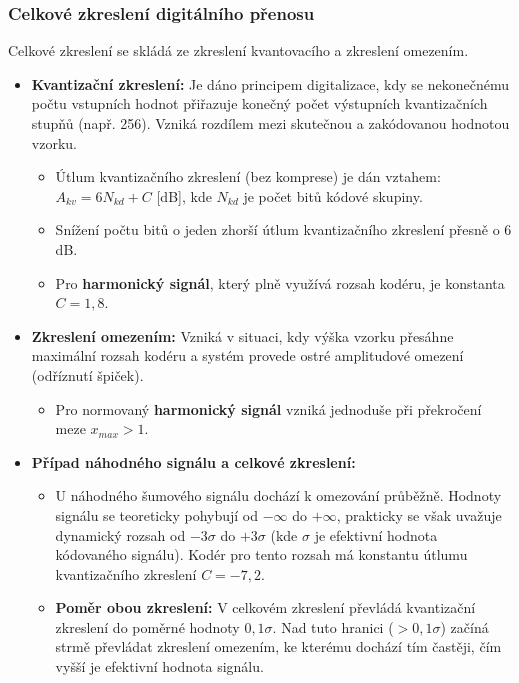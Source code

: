     \subsubsection{Celkové zkreslení digitálního přenosu}
        Celkové zkreslení se skládá ze zkreslení kvantovacího a zkreslení omezením.
        \begin{itemize}
            \item \textbf{Kvantizační zkreslení:} Je dáno principem digitalizace, kdy se nekonečnému počtu vstupních hodnot přiřazuje konečný počet výstupních kvantizačních stupňů (např. 256). Vzniká rozdílem mezi skutečnou a zakódovanou hodnotou vzorku.
            \begin{itemize}
                \item Útlum kvantizačního zkreslení (bez komprese) je dán vztahem: $A_{kv} = 6N_{kd} + C$ [dB], kde $N_{kd}$ je počet bitů kódové skupiny.
                \item Snížení počtu bitů o jeden zhorší útlum kvantizačního zkreslení přesně o 6 dB.
                \item Pro \textbf{harmonický signál}, který plně využívá rozsah kodéru, je konstanta $C = 1,8$.
            \end{itemize}
        
            \item \textbf{Zkreslení omezením:} Vzniká v situaci, kdy výška vzorku přesáhne maximální rozsah kodéru a systém provede ostré amplitudové omezení (odříznutí špiček).
            \begin{itemize}
                \item Pro normovaný \textbf{harmonický signál} vzniká jednoduše při překročení meze $x_{max} > 1$.
            \end{itemize}
        
            \item \textbf{Případ náhodného signálu a celkové zkreslení:}
            \begin{itemize}
                \item U náhodného šumového signálu dochází k omezování průběžně. Hodnoty signálu se teoreticky pohybují od $-\infty$ do $+\infty$, prakticky se však uvažuje dynamický rozsah od $-3\sigma$ do $+3\sigma$ (kde $\sigma$ je efektivní hodnota kódovaného signálu). Kodér pro tento rozsah má konstantu útlumu kvantizačního zkreslení $C = -7,2$.
                \item \textbf{Poměr obou zkreslení:} V celkovém zkreslení převládá kvantizační zkreslení do poměrné hodnoty $0,1\sigma$. Nad tuto hranici ($> 0,1\sigma$) začíná strmě převládat zkreslení omezením, ke kterému dochází tím častěji, čím vyšší je efektivní hodnota signálu.
            \end{itemize}
        \end{itemize}
